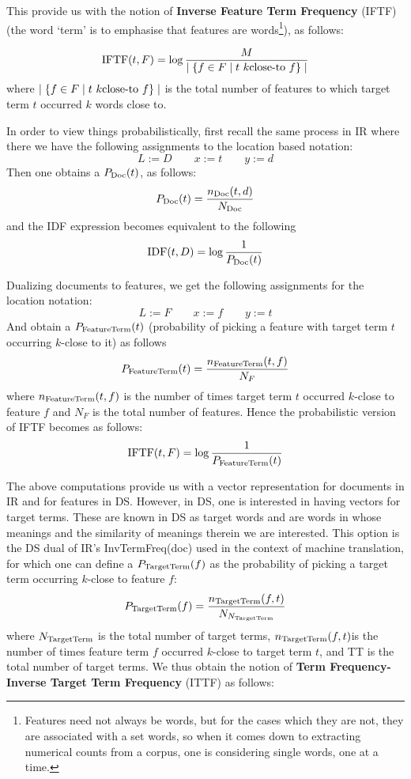 This provide  us with the notion of {\bf Inverse Feature Term Frequency}  (IFTF)  (the word `term'  is to emphasise that features are words\footnote{Features need not always be words, but for the cases which they are not, they are associated with a set words, so when it comes down to extracting numerical counts from a corpus, one is considering single words, one at a time. }),   as follows:

\begin{equation}
\label{iftf}
\textmd{IFTF}(t, F) = \log{{M} \over {\mid \{f \in F \mid t  \ k\textmd{close-to} \ f \} \mid}}
\end{equation}
where $ \mid \{f \in F \mid t  \ k\textmd{close-to} \ f \} \mid$ is the total number of features to which target  term $t$ occurred $k$ words close to. 

In order to view things probabilistically, first recall the same process in IR where there we have the following assignments to the location based notation:
\[
L := D\qquad
x := t \qquad y := d
\]
Then one obtains  a $P_{\textmd{Doc}}(t)$,  as follows:
\[
P_{\textmd{Doc}}(t) = \frac{n_{\textmd{Doc}}(t,d)}{N_{\textmd{Doc}}} 
\]
and the IDF expression becomes equivalent to the following 
\[
\textmd{IDF} (t, D) = \log{\frac{1}{P_{\textmd{Doc}}(t)}}
\]



Dualizing   documents   to  features,  we get the following assignments for the location notation:
\[
L := F \qquad
x := f\qquad
y := t
\]
And obtain a    $P_{\textmd{FeatureTerm}}(t)$ (probability of picking a feature with target term $t$ occurring $k$-close to it) as follows
\[
P_{\textmd{FeatureTerm}}(t) = \frac{n_{\textmd{FeatureTerm}}(t,f)}{N_F} 
\]
where $n_{\textmd{FeatureTerm}}(t,f)$ is the number of times target term $t$ occurred $k$-close to feature $f$ and $N_F$ is the total number of features. Hence the probabilistic version of IFTF becomes as follows:
\[
\textmd{IFTF}(t, F) =  \log{\frac{1}{P_{\textmd{FeatureTerm}}(t)}}
\]

\medskip
The above computations provide us with a vector representation for documents in IR and for features in DS. However, in DS, one is interested in having vectors for target terms. These are known in DS as target words and  are words in whose meanings and the similarity of meanings therein we are interested.  This  option is the DS dual of IR's  InvTermFreq(doc) used in the context of machine translation, for which one can define a $P_{\textmd{TargetTerm}}(f) $ as the  probability of picking a target term  occurring $k$-close to feature $f$: 
\[
P_{\textmd{TargetTerm}}(f) = \frac{n_{\textmd{TargetTerm}}(f, t)}{N_{N_{\textmd{TargetTerm}}}}
\]
where  $N_{\textmd{TargetTerm}}$ is the total number of target terms,    $n_{\textmd{TargetTerm}}(f, t)$is the number of  times feature term $f$ occurred   $k$-close to target term  $t$,  and TT is the total number of target terms. We thus obtain the notion of  {\bf Term Frequency-Inverse Target Term Frequency} (ITTF) as follows:

